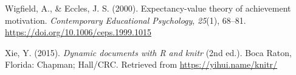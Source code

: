 \documentclass[
  man]{apa6}
\newlength{\cslhangindent}
\newlength{\cslentryspacingunit} %
\newenvironment{CSLReferences}[2] %
 {%
  \setlength{\parindent}{0pt}
  \ifodd #1
  \let\oldpar\par
  \def\par{\hangindent=\cslhangindent\oldpar}
  \fi
  \setlength{\parskip}{#2\cslentryspacingunit}
 }%
 {}
\begin{document}
\begin{CSLReferences}{1}{0}
\leavevmode{}%
Wigfield, A., \& Eccles, J. S. (2000). Expectancy-value theory of achievement motivation. \emph{Contemporary Educational Psychology}, \emph{25}(1), 68--81. \url{https://doi.org/10.1006/ceps.1999.1015}

\leavevmode{}%
Xie, Y. (2015). \emph{Dynamic documents with {R} and knitr} (2nd ed.). Boca Raton, Florida: Chapman; Hall/CRC. Retrieved from \url{https://yihui.name/knitr/}

\end{CSLReferences}

\endgroup

\newpage
\end{document}
